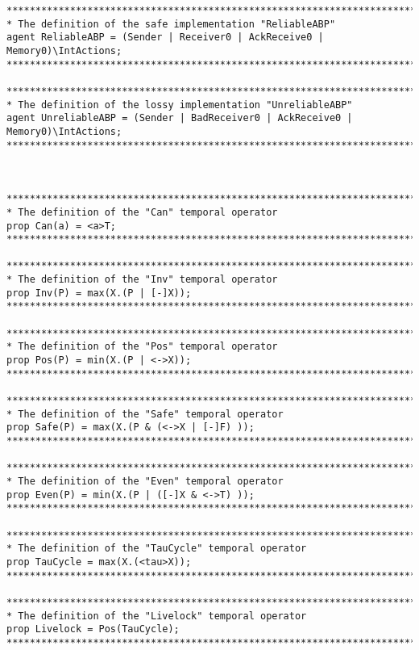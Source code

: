 \begin{verbatim}
*******************************************************************************
* The definition of the safe implementation "ReliableABP"
agent ReliableABP = (Sender | Receiver0 | AckReceive0 | Memory0)\IntActions;
*******************************************************************************

*******************************************************************************
* The definition of the lossy implementation "UnreliableABP"
agent UnreliableABP = (Sender | BadReceiver0 | AckReceive0 | Memory0)\IntActions;
*******************************************************************************



*******************************************************************************
* The definition of the "Can" temporal operator
prop Can(a) = <a>T;
*******************************************************************************

*******************************************************************************
* The definition of the "Inv" temporal operator
prop Inv(P) = max(X.(P | [-]X));
*******************************************************************************

*******************************************************************************
* The definition of the "Pos" temporal operator
prop Pos(P) = min(X.(P | <->X));
*******************************************************************************

*******************************************************************************
* The definition of the "Safe" temporal operator
prop Safe(P) = max(X.(P & (<->X | [-]F) ));
*******************************************************************************

*******************************************************************************
* The definition of the "Even" temporal operator
prop Even(P) = min(X.(P | ([-]X & <->T) ));
*******************************************************************************

*******************************************************************************
* The definition of the "TauCycle" temporal operator
prop TauCycle = max(X.(<tau>X));
*******************************************************************************

*******************************************************************************
* The definition of the "Livelock" temporal operator
prop Livelock = Pos(TauCycle);
*******************************************************************************


\end{verbatim}
